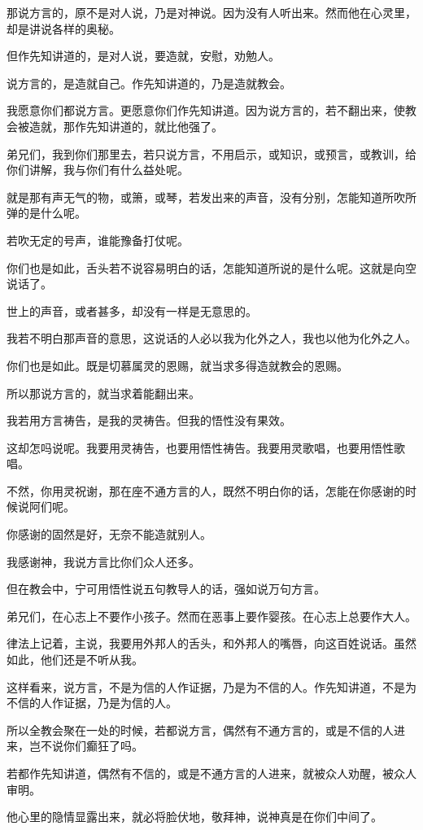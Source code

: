 \documentclass[12pt,oneside]{book}
\begin{document}
那说方言的，原不是对人说，乃是对神说。因为没有人听出来。然而他在心灵里，却是讲说各样的奥秘。

但作先知讲道的，是对人说，要造就，安慰，劝勉人。

说方言的，是造就自己。作先知讲道的，乃是造就教会。

我愿意你们都说方言。更愿意你们作先知讲道。因为说方言的，若不翻出来，使教会被造就，那作先知讲道的，就比他强了。

弟兄们，我到你们那里去，若只说方言，不用启示，或知识，或预言，或教训，给你们讲解，我与你们有什么益处呢。

就是那有声无气的物，或箫，或琴，若发出来的声音，没有分别，怎能知道所吹所弹的是什么呢。

若吹无定的号声，谁能豫备打仗呢。

你们也是如此，舌头若不说容易明白的话，怎能知道所说的是什么呢。这就是向空说话了。

世上的声音，或者甚多，却没有一样是无意思的。

我若不明白那声音的意思，这说话的人必以我为化外之人，我也以他为化外之人。

你们也是如此。既是切慕属灵的恩赐，就当求多得造就教会的恩赐。

所以那说方言的，就当求着能翻出来。

我若用方言祷告，是我的灵祷告。但我的悟性没有果效。

这却怎吗说呢。我要用灵祷告，也要用悟性祷告。我要用灵歌唱，也要用悟性歌唱。

不然，你用灵祝谢，那在座不通方言的人，既然不明白你的话，怎能在你感谢的时候说阿们呢。

你感谢的固然是好，无奈不能造就别人。

我感谢神，我说方言比你们众人还多。

但在教会中，宁可用悟性说五句教导人的话，强如说万句方言。

弟兄们，在心志上不要作小孩子。然而在恶事上要作婴孩。在心志上总要作大人。

律法上记着，主说，我要用外邦人的舌头，和外邦人的嘴唇，向这百姓说话。虽然如此，他们还是不听从我。

这样看来，说方言，不是为信的人作证据，乃是为不信的人。作先知讲道，不是为不信的人作证据，乃是为信的人。

所以全教会聚在一处的时候，若都说方言，偶然有不通方言的，或是不信的人进来，岂不说你们癫狂了吗。

若都作先知讲道，偶然有不信的，或是不通方言的人进来，就被众人劝醒，被众人审明。

他心里的隐情显露出来，就必将脸伏地，敬拜神，说神真是在你们中间了。
\end{document}
